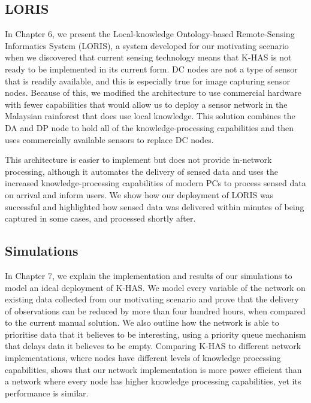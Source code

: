 \subsection{LORIS}
In Chapter 6, we present the Local-knowledge Ontology-based Remote-Sensing Informatics System (LORIS), a system developed for our motivating scenario when we discovered that current sensing technology means that K-HAS is not ready to be implemented in its current form. DC nodes are not a type of sensor that is readily available, and this is especially true for image capturing sensor nodes. Because of this, we modified the architecture to use commercial hardware with fewer capabilities that would allow us to deploy a sensor network in the Malaysian rainforest that does use local knowledge. This solution combines the DA and DP node to hold all of the knowledge-processing capabilities and then uses commercially available sensors to replace DC nodes. 

This architecture is easier to implement but does not provide in-network processing, although it automates the delivery of sensed data and uses the increased knowledge-processing capabilities of modern PCs to process sensed data on arrival and inform users. We show how our deployment of LORIS was successful and highlighted how sensed data was delivered within minutes of being captured in some cases, and processed shortly after. 
\subsection{Simulations}
In Chapter 7, we explain the implementation and results of our simulations to model an ideal deployment of K-HAS. We model every variable of the network on existing data collected from our motivating scenario and prove that the delivery of observations can be reduced by more than four hundred hours, when compared to the current manual solution. We also outline how the network is able to prioritise data that it believes to be interesting, using a priority queue mechanism that delays data it believes to be empty. Comparing K-HAS to different network implementations, where nodes have different levels of knowledge processing capabilities, shows that our network implementation is more power efficient than a network where every node has higher knowledge processing capabilities, yet its performance is similar.

